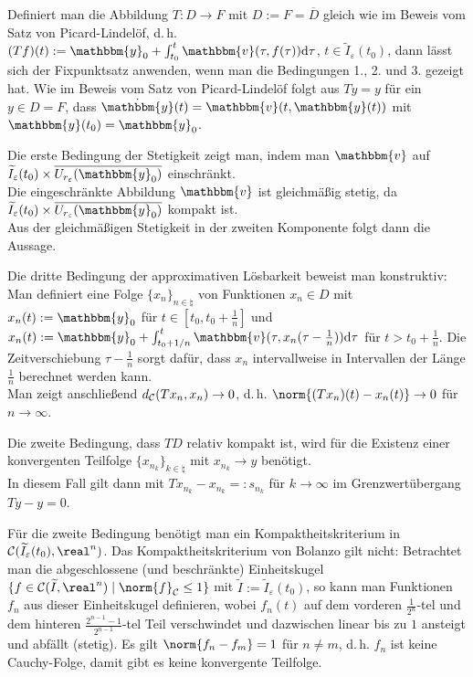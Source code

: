 Definiert man die Abbildung $T\colon D \rightarrow F$ mit
$D := F = \overline{D}$ gleich wie im Beweis vom Satz von Picard-Lindelöf,
d.\,h. $(Tf)(t) := \mathbbm{y}_0 +
\int_{t_0}^t \mathbbm{v}(\tau, f(\tau))\d\tau$,
$t \in \widetilde{I}_\varepsilon(t_0)$, dann lässt sich der Fixpunktsatz
anwenden, wenn man die Bedingungen 1., 2. und 3. gezeigt hat.
Wie im Beweis vom Satz von Picard-Lindelöf folgt aus $Ty = y$ für ein
$y \in D = F$, dass $\dot{\mathbbm{y}}(t) = \mathbbm{v}(t, \mathbbm{y}(t))$
mit $\mathbbm{y}(t_0) = \mathbbm{y}_0$.

\linie

Die erste Bedingung der Stetigkeit zeigt man, indem man $\mathbbm{v}$ auf
$\widetilde{I}_\varepsilon(t_0) \times
\overline{U_{r_\varepsilon}(\mathbbm{y}_0)}$ einschränkt. \\
Die eingeschränkte Abbildung $\mathbbm{v}$ ist gleichmäßig stetig, da
$\widetilde{I}_\varepsilon(t_0) \times
\overline{U_{r_\varepsilon}(\mathbbm{y}_0)}$ kompakt ist. \\
Aus der gleichmäßigen Stetigkeit in der zweiten Komponente folgt dann die
Aussage.

Die dritte Bedingung der approximativen Lösbarkeit beweist man konstruktiv:
Man definiert eine Folge $\{x_n\}_{n \in \natural}$ von Funktionen $x_n \in D$
mit $x_n(t) := \mathbbm{y}_0$ für $t \in [t_0, t_0 + \frac{1}{n}]$ und \\
$x_n(t) := \mathbbm{y}_0 +
\int_{t_0+1/n}^t \mathbbm{v}(\tau, x_n(\tau - \frac{1}{n}))\d\tau$
für $t > t_0 + \frac{1}{n}$.
Die Zeitverschiebung $\tau - \frac{1}{n}$ sorgt dafür, dass $x_n$
intervallweise in Intervallen der Länge $\frac{1}{n}$ berechnet werden kann. \\
Man zeigt anschließend $d_{\mathcal{C}}(Tx_n, x_n) \to 0$, d.\,h.
$\norm{(Tx_n)(t) - x_n(t)} \to 0$ für $n \to \infty$.

\linie

Die zweite Bedingung, dass $TD$ relativ kompakt ist, wird für die Existenz
einer konvergenten Teilfolge
$\{x_{n_k}\}_{k \in \natural}$ mit $x_{n_k} \to y$ benötigt. \\
In diesem Fall gilt dann mit $Tx_{n_k} - x_{n_k} =: s_{n_k}$ für $k \to \infty$
im Grenzwertübergang $Ty - y = 0$.

Für die zweite Bedingung benötigt man ein Kompaktheitskriterium
in $\C(\widetilde{I}_\varepsilon(t_0), \real^n)$.
Das Kompaktheitskriterium von Bolanzo gilt nicht:
Betrachtet man die abgeschlossene (und beschränkte) Einheitskugel
$\{f \in \C(\widetilde{I}, \real^n) \;|\; \norm{f}_\C \le 1\}$ mit
$\widetilde{I} := \widetilde{I}_\varepsilon(t_0)$, so kann man Funktionen $f_n$
aus dieser Einheitskugel definieren, wobei $f_n(t)$ auf dem vorderen
$\frac{1}{2^n}$-tel und dem hinteren $\frac{2^{n-1} - 1}{2^{n-1}}$-tel Teil
verschwindet und dazwischen linear bis zu $1$ ansteigt und abfällt (stetig).
Es gilt $\norm{f_n - f_m} = 1$ für $n \not= m$, d.\,h. $f_n$ ist keine
Cauchy-Folge, damit gibt es keine konvergente Teilfolge.

